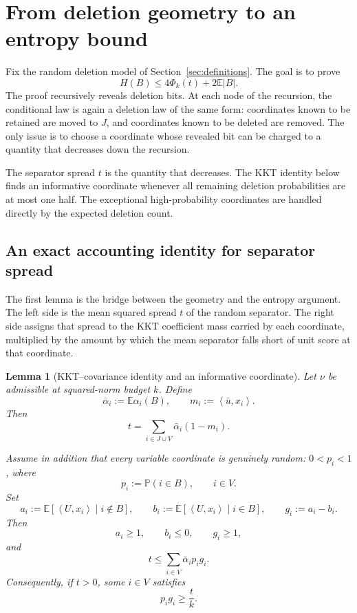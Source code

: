 \documentclass[11pt]{article}
\newtheorem{lemma}[theorem]{Lemma}
\theoremstyle{definition}
\theoremstyle{remark}
\newcommand{\E}{\mathbb E}
\newcommand{\Pp}{\mathbb P}
\newcommand{\ip}[2]{\left\langle #1,#2\right\rangle}
\begin{document}
\section{From deletion geometry to an entropy bound}
\label{sec:entropy-proof}

Fix the random deletion model of Section~\ref{sec:definitions}. The goal is
to prove
\[
 H(B)\le4\Phi_k(t)+2\E|B|.
\]
The proof recursively reveals deletion bits. At each node of the recursion,
the conditional law is again a deletion law of the same form: coordinates
known to be retained are moved to \(J\), and coordinates known to be deleted
are removed. The only issue is to choose a coordinate whose revealed bit can
be charged to a quantity that decreases down the recursion.

The separator spread \(t\) is the quantity that decreases. The KKT identity
below finds an informative coordinate whenever all remaining deletion
probabilities are at most one half. The exceptional high-probability
coordinates are handled directly by the expected deletion count.
\subsection{An exact accounting identity for separator spread}

The first lemma is the bridge between the geometry and the entropy argument.
The left side is the mean squared spread \(t\) of the random separator. The
right side assigns that spread to the KKT coefficient mass carried by each
coordinate, multiplied by the amount by which the mean separator falls short
of unit score at that coordinate.

\begin{lemma}[KKT--covariance identity and an informative coordinate]
\label{lem:covariance-identity}
Let \(\nu\) be admissible at squared-norm budget \(k\). Define
\[
 \bar\alpha_i:=\E\alpha_i(B),
 \qquad
 m_i:=\ip{\bar u}{x_i}.
\]
Then
\[
 \boxed{
 t=
 \sum_{i\in J\cup V}\bar\alpha_i(1-m_i).}
 \tag{3.1}
\]

Assume in addition that every variable coordinate is genuinely random:
\(0<p_i<1\), where
\[
 p_i:=\Pp(i\in B),
 \qquad
 i\in V.
\]
Set
\[
 a_i:=\E[\ip{U}{x_i}\mid i\notin B],
 \qquad
 b_i:=\E[\ip{U}{x_i}\mid i\in B],
 \qquad
 g_i:=a_i-b_i.
\]
Then
\[
 a_i\ge1,
 \qquad
 b_i\le0,
 \qquad
 g_i\ge1,
\]
and
\[
 \boxed{
 t\le
 \sum_{i\in V}\bar\alpha_i p_i g_i.}
 \tag{3.2}
\]
Consequently, if \(t>0\), some \(i\in V\) satisfies
\[
 \boxed{
 p_i g_i\ge\frac{t}{k}.}
 \tag{3.3}
\]
\end{lemma}
\end{document}
